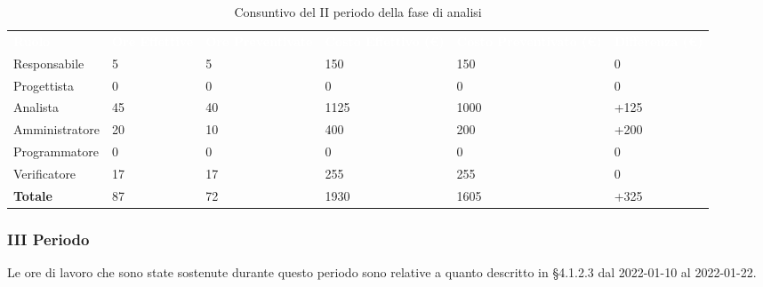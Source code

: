 \begin{table}[!htbp]
\begin{center}
\renewcommand{\arraystretch}{1.5}
\begin{tabular}{ m{}<{\centering}  m{}<{\centering} m{}<{\centering} m{}<{\centering} m{}<{\centering} m{}<{\centering}}
	\rowcolor{darkblue}
	\textcolor{white}{\textbf{Ruolo}} & \textcolor{white}{\textbf{Ore Effettive}} & \textcolor{white}{\textbf{Ore Preventivate}}&\textcolor{white}{\textbf{Costo Effettivo (\euro) }}&\textcolor{white}{\textbf{Costo Preventivato (\euro)}}&\textcolor{white}{\textbf{Differenza (\euro)}}\\ 

	Responsabile  & 5 & 5 & 150 & 150 & 0\\	
	
	Progettista & 0 & 0 & 0 & 0 & 0\\
	
	Analista & 45 & 40 & 1125 & 1000 & +125\\
	
	Amministratore & 20 & 10 & 400 & 200 & +200\\
	
	Programmatore & 0 & 0 &0 &0 & 0\\
	
	Verificatore & 17 & 17 & 255 & 255 & 0\\
	
	\textbf{Totale} & 87 & 72 & 1930 & 1605 & +325\\
	
\end{tabular}
\caption{Consuntivo del II periodo della fase di analisi}
\end{center}
\end{table}


\subsubsection{III Periodo}
Le ore di lavoro che sono state sostenute durante questo periodo sono relative a quanto descritto in §4.1.2.3 dal 2022-01-10 al 2022-01-22.

